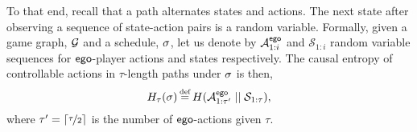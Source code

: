 {{{To that end, recall that a path alternates states and actions.  The
next state after observing a sequence of state-action pairs is a
random variable. Formally, given a game graph, $\mathcal{G}$ and a schedule,
$\sigma$, let us denote by $\mathcal{A}^{\mathsf{ego}}_{1:i}$ and
$\mathcal{S}_{1:i}$ random variable sequences for
$\mathsf{ego}$-player actions and states respectively. The causal entropy of
controllable actions in $\tau$-length paths under $\sigma$ is then,
\begin{equation}
   H_\tau(\sigma) \eqdef H( \mathcal{A}^{\pOne}_{1:\tau'} \mid\mid \mathcal{S}_{1:\tau} ),
\end{equation}
where $\tau' = \lceil \nicefrac{\tau}{2}\rceil$ is the number of $\mathsf{ego}$-actions given $\tau$.



\begin{example}
	
\end{example}

}}}

